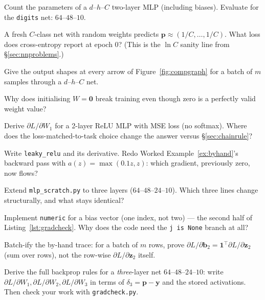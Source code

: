 \begin{exercise}[{[easy]}]
Count the parameters of a $d$--$h$--$C$ two-layer MLP (including
biases). Evaluate for the \texttt{digits} net: $64$--$48$--$10$.
\end{exercise}
\begin{exercise}[{[easy]}]
A fresh $C$-class net with random weights predicts $\mathbf
p\approx(1/C,\ldots,1/C)$. What loss does cross-entropy report at
epoch 0? (This is the $\ln C$ sanity line from \S\ref{sec:nnproblems}.)
\end{exercise}
\begin{exercise}[{[easy]}]
Give the output shapes at every arrow of
Figure~\ref{fig:compgraph} for a batch of $m$ samples through a
$d$--$h$--$C$ net.
\end{exercise}
\begin{exercise}[{[easy]}]
Why does initialising $W=\mathbf 0$ break training even though zero is
a perfectly valid weight value?
\end{exercise}
\begin{exercise}[{[medium]}]
Derive $\partial L/\partial W_1$ for a 2-layer ReLU MLP with MSE loss
(no softmax). Where does the loss-matched-to-task choice change the
answer versus \S\ref{sec:chainrule}?
\end{exercise}
\begin{exercise}[{[medium]}]
Write \texttt{leaky\_relu} and its derivative. Redo Worked
Example~\ref{ex:byhand}'s backward pass with $a(z)=\max(0.1z,z)$:
which gradient, previously zero, now flows?
\end{exercise}
\begin{exercise}[{[medium]}]
Extend \texttt{mlp\_scratch.py} to three layers ($64$--$48$--$24$--$10$).
Which three lines change structurally, and what stays identical?
\end{exercise}
\begin{exercise}[{[medium]}]
Implement \texttt{numeric} for a bias vector (one index, not two) ---
the second half of Listing~\ref{lst:gradcheck}. Why does the code need
the \texttt{j is None} branch at all?
\end{exercise}
\begin{exercise}[{[medium]}]
Batch-ify the by-hand trace: for a batch of $m$ rows, prove
$\partial L/\partial\mathbf b_2 =
\mathbf 1^{\top}\partial L/\partial\mathbf z_2$ (sum over rows), not
the row-wise $\partial L/\partial\mathbf z_2$ itself.
\end{exercise}
\begin{exercise}[{[hard]}]
Derive the full backprop rules for a \emph{three}-layer net
$64$--$48$--$24$--$10$: write
$\partial L/\partial W_1,\partial L/\partial W_2,\partial L/\partial
W_3$ in terms of $\delta_3=\mathbf p-\mathbf y$ and the stored
activations. Then check your work with \texttt{gradcheck.py}.
\end{exercise}
